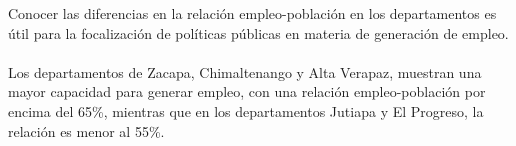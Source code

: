 Conocer las diferencias en la relación empleo-población en los departamentos es útil para la focalización de políticas públicas en materia de generación de empleo. \\\\ Los departamentos de Zacapa, Chimaltenango y Alta Verapaz, muestran una mayor capacidad para generar empleo, con una relación empleo-población por encima del 65\%, mientras que en los departamentos Jutiapa y El Progreso, la relación es menor al 55\%.
